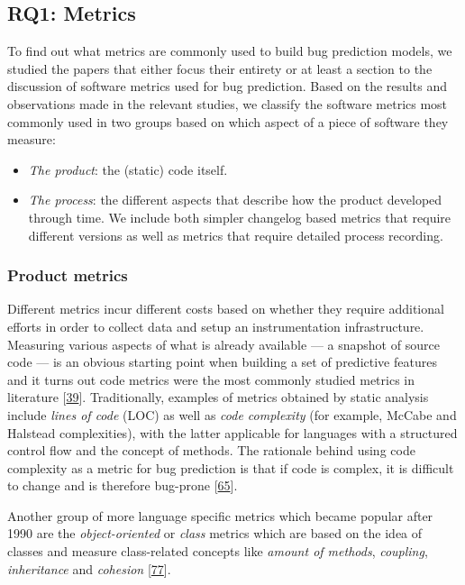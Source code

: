 \documentclass[]{book}
\providecommand{\tightlist}{%
  \setlength{\itemsep}{0pt}\setlength{\parskip}{0pt}}
\begin{document}
\subsection{RQ1: Metrics}\label{rq1-metrics}

To find out what metrics are commonly used to build bug prediction
models, we studied the papers that either focus their entirety or at
least a section to the discussion of software metrics used for bug
prediction. Based on the results and observations made in the relevant
studies, we classify the software metrics most commonly used in two
groups based on which aspect of a piece of software they measure:

\begin{itemize}
\tightlist
\item
  \emph{The product}: the (static) code itself.
\item
  \emph{The process}: the different aspects that describe how the
  product developed through time. We include both simpler changelog
  based metrics that require different versions as well as metrics that
  require detailed process recording.
\end{itemize}

\subsubsection{Product metrics}\label{product-metrics}

Different metrics incur different costs based on whether they require
additional efforts in order to collect data and setup an instrumentation
infrastructure. Measuring various aspects of what is already available
--- a snapshot of source code --- is an obvious starting point when
building a set of predictive features and it turns out code metrics were
the most commonly studied metrics in literature
{[}\protect\hyperlink{ref-Catal2009review}{39}{]}. Traditionally,
examples of metrics obtained by static analysis include \emph{lines of
code} (LOC) as well as \emph{code complexity} (for example, McCabe and
Halstead complexities), with the latter applicable for languages with a
structured control flow and the concept of methods. The rationale behind
using code complexity as a metric for bug prediction is that if code is
complex, it is difficult to change and is therefore bug-prone
{[}\protect\hyperlink{ref-DAmbros2012}{65}{]}.

Another group of more language specific metrics which became popular
after 1990 are the \emph{object-oriented} or \emph{class} metrics which
are based on the idea of classes and measure class-related concepts like
\emph{amount of methods}, \emph{coupling}, \emph{inheritance} and
\emph{cohesion} {[}\protect\hyperlink{ref-Gyimothy2005}{77}{]}.
\end{document}
